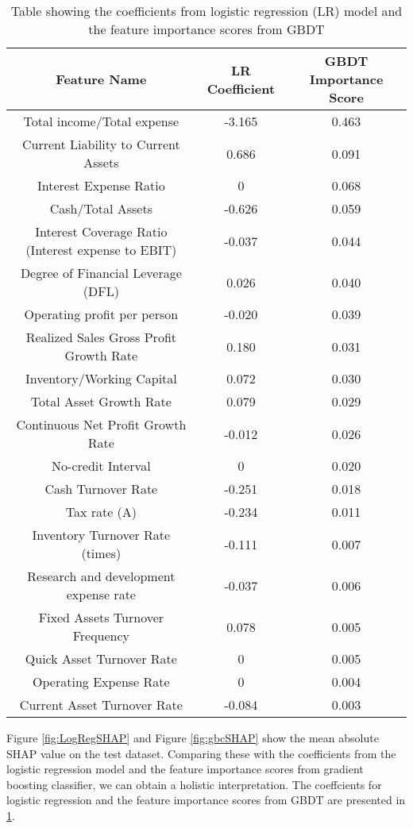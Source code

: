 \documentclass[11pt]{article}
\begin{document}
\begin{table}[]
    \centering
    \begin{tabular}{|c|c|c|}
    \hline
    Feature Name & LR Coefficient & GBDT Importance Score \\ \hline
       Total income/Total expense & -3.165 & 0.463 \\ \hline
Current Liability to Current Assets & 0.686 & 0.091 \\ \hline
Interest Expense Ratio & 0 & 0.068 \\ \hline
Cash/Total Assets & -0.626 & 0.059 \\ \hline
Interest Coverage Ratio (Interest expense to EBIT) & -0.037 & 0.044 \\ \hline
Degree of Financial Leverage (DFL) & 0.026 & 0.040 \\ \hline
Operating profit per person & -0.020 & 0.039 \\ \hline
Realized Sales Gross Profit Growth Rate & 0.180 & 0.031 \\ \hline
Inventory/Working Capital & 0.072 & 0.030 \\ \hline
Total Asset Growth Rate & 0.079 & 0.029 \\ \hline
Continuous Net Profit Growth Rate & -0.012 & 0.026 \\ \hline
No-credit Interval & 0 & 0.020 \\ \hline
Cash Turnover Rate & -0.251 & 0.018 \\ \hline
Tax rate (A) & -0.234 & 0.011 \\ \hline
Inventory Turnover Rate (times) & -0.111 & 0.007 \\ \hline
Research and development expense rate & -0.037 & 0.006 \\ \hline
Fixed Assets Turnover Frequency & 0.078 & 0.005 \\ \hline
Quick Asset Turnover Rate & 0 & 0.005 \\ \hline
Operating Expense Rate & 0 & 0.004 \\ \hline
Current Asset Turnover Rate & -0.084 & 0.003 \\ \hline
    \end{tabular}
    \caption{Table showing the coefficients from logistic regression (LR) model and the feature importance scores from GBDT}
    \label{tab:modelFeatureImportances}
\end{table}

Figure \ref{fig:LogRegSHAP} and Figure \ref{fig:gbcSHAP} show the mean absolute SHAP value on the test dataset. Comparing these with the coefficients from the logistic regression model and the feature importance scores from gradient boosting classifier, we can obtain a holistic interpretation. The coeffcients for logistic regression and the feature importance scores from GBDT are presented in \ref{tab:modelFeatureImportances}. \\
\end{document}
